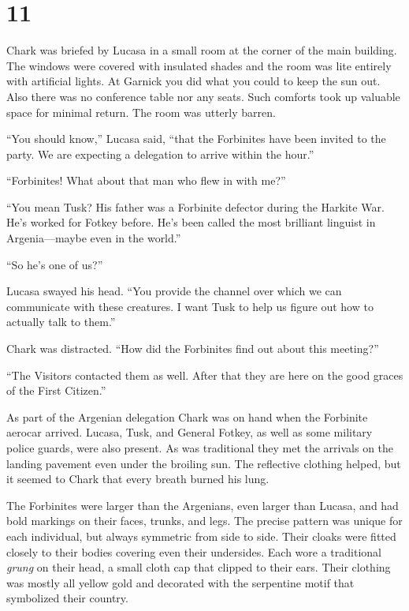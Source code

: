 
\chapter{11}

Chark was briefed by Lucasa in a small room at the corner of the main building. The windows were
covered with insulated shades and the room was lite entirely with artificial lights. At Garnick
you did what you could to keep the sun out. Also there was no conference table nor any seats.
Such comforts took up valuable space for minimal return. The room was utterly barren.

``You should know,'' Lucasa said, ``that the Forbinites have been invited to the party. We are
expecting a delegation to arrive within the hour.''

``Forbinites! What about that man who flew in with me?''

``You mean Tusk? His father was a Forbinite defector during the Harkite War. He's worked for
Fotkey before. He's been called the most brilliant linguist in Argenia---maybe even in the
world.''

``So he's one of us?''

Lucasa swayed his head. ``You provide the channel over which we can communicate with these
creatures. I want Tusk to help us figure out how to actually talk to them.''

Chark was distracted. ``How did the Forbinites find out about this meeting?''

``The Visitors contacted them as well. After that they are here on the good graces of the First
Citizen.''

As part of the Argenian delegation Chark was on hand when the Forbinite aerocar arrived. Lucasa,
Tusk, and General Fotkey, as well as some military police guards, were also present. As was
traditional they met the arrivals on the landing pavement even under the broiling sun. The
reflective clothing helped, but it seemed to Chark that every breath burned his lung.

The Forbinites were larger than the Argenians, even larger than Lucasa, and had bold markings on
their faces, trunks, and legs. The precise pattern was unique for each individual, but always
symmetric from side to side. Their cloaks were fitted closely to their bodies covering even
their undersides. Each wore a traditional \textit{grung} on their head, a small cloth cap that
clipped to their ears. Their clothing was mostly all yellow gold and decorated with the
serpentine motif that symbolized their country.

